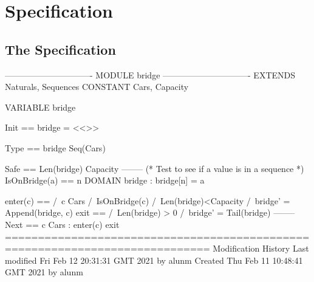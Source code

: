 \documentclass[12pt]{article}
\begin{document}
\section{{Specification}}
\subsection{The Specification} 
\begin{tla}
------------------------------- MODULE bridge -------------------------------
EXTENDS Naturals, Sequences 
CONSTANT Cars, Capacity

VARIABLE bridge

Init == bridge = <<>>

Type == bridge \in Seq(Cars)

Safe == Len(bridge) \leq Capacity
--------
(* Test to see if a value is in a sequence *)
IsOnBridge(a) == \E n \in DOMAIN bridge : bridge[n] = a 

enter(c) == 
     /\ c \in Cars
     /\ \lnot IsOnBridge(c)
     /\ Len(bridge)<Capacity
     /\ bridge' = Append(bridge, c)
exit == 
    /\ Len(bridge) > 0
    /\ bridge' = Tail(bridge)
--------
Next ==
    \/ \E c \in Cars : enter(c)
    \/ exit
=============================================================================
\* Modification History
\* Last modified Fri Feb 12 20:31:31 GMT 2021 by alunm
\* Created Thu Feb 11 10:48:41 GMT 2021 by alunm
\end{tla}
\begin{tlatex}
\@x{}\moduleLeftDash{}\moduleRightDash\@xx{}%
%
%
\@pvspace{8.0pt}%
%
\@pvspace{8.0pt}%
%
\@pvspace{8.0pt}%
%
\@pvspace{8.0pt}%
%
\@x{}\midbar\@xx{}%
\@x{}%
%
\@xx{}%
\@pvspace{8.0pt}%
%
%
%
%
%
%
%
%
\@x{}\midbar\@xx{}%
%
%
%
\@x{}\bottombar\@xx{}%
\@x{}%
%
\@xx{}%
\@x{}%
%
\@xx{}%
\@x{}%
%
\@xx{}%
\end{tlatex}
\end{document}
